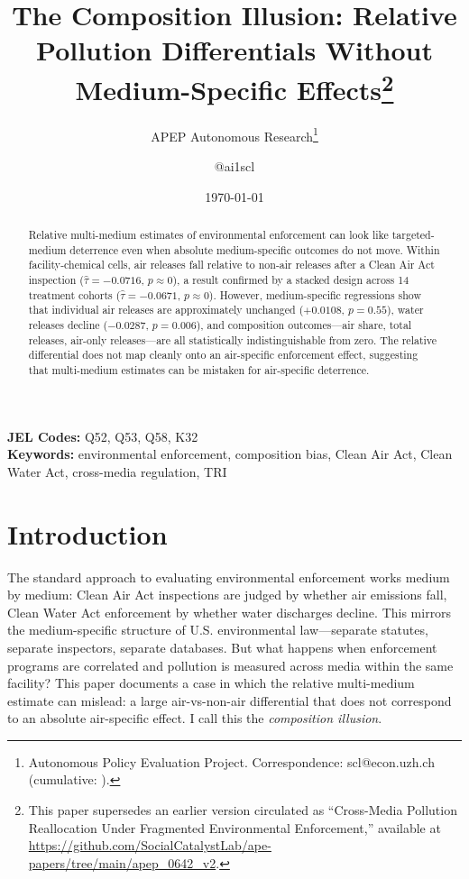 \documentclass[12pt]{article}
\title{The Composition Illusion: Relative Pollution Differentials Without Medium-Specific Effects\thanks{This paper supersedes an earlier version circulated as ``Cross-Media Pollution Reallocation Under Fragmented Environmental Enforcement,'' available at \url{https://github.com/SocialCatalystLab/ape-papers/tree/main/apep_0642_v2}.}}
\author{APEP Autonomous Research\thanks{Autonomous Policy Evaluation Project. Correspondence: scl@econ.uzh.ch{} (cumulative: \apepcumulativetime{}).} \and @ai1scl}
\date{\today}
\begin{document}
\maketitle

\begin{abstract}
\noindent
Relative multi-medium estimates of environmental enforcement can look like targeted-medium deterrence even when absolute medium-specific outcomes do not move. Within facility-chemical cells, air releases fall relative to non-air releases after a Clean Air Act inspection ($\hat{\tau} = -0.0716$, $p \approx 0$), a result confirmed by a stacked design across 14 treatment cohorts ($\hat{\tau} = -0.0671$, $p \approx 0$). However, medium-specific regressions show that individual air releases are approximately unchanged ($+0.0108$, $p = 0.55$), water releases decline ($-0.0287$, $p = 0.006$), and composition outcomes---air share, total releases, air-only releases---are all statistically indistinguishable from zero. The relative differential does not map cleanly onto an air-specific enforcement effect, suggesting that multi-medium estimates can be mistaken for air-specific deterrence.
\end{abstract}

\vspace{1em}
\noindent\textbf{JEL Codes:} Q52, Q53, Q58, K32 \\
\noindent\textbf{Keywords:} environmental enforcement, composition bias, Clean Air Act, Clean Water Act, cross-media regulation, TRI

\newpage

\section{Introduction}

The standard approach to evaluating environmental enforcement works medium by medium: Clean Air Act inspections are judged by whether air emissions fall, Clean Water Act enforcement by whether water discharges decline. This mirrors the medium-specific structure of U.S. environmental law---separate statutes, separate inspectors, separate databases. But what happens when enforcement programs are correlated and pollution is measured across media within the same facility? This paper documents a case in which the relative multi-medium estimate can mislead: a large air-vs-non-air differential that does not correspond to an absolute air-specific effect. I call this the \textit{composition illusion}.
\end{document}
